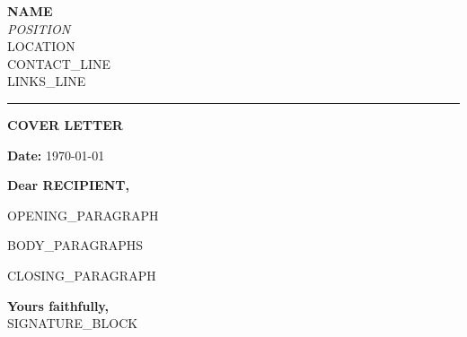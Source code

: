 \documentclass[11pt,a4]{article}
\begin{document}
\begin{center}
    \textbf{\Large {{NAME}}} \\[4pt]
    \textit{{{POSITION}}} \\
    {{LOCATION}} \\[4pt]
    {{CONTACT_LINE}} \\[2pt]
    {{LINKS_LINE}}
\end{center}

\vspace{0.2cm}
\hrule
\vspace{0.4cm}

\begin{center}
    {\LARGE \textbf{COVER LETTER}}
\end{center}

\vspace{0.2cm}
\textbf{Date:} \today

\vspace{0.3cm}
\textbf{Dear {{RECIPIENT}},}

\justify

{{OPENING_PARAGRAPH}}

{{BODY_PARAGRAPHS}}

{{CLOSING_PARAGRAPH}}

\vspace{0.5cm}
\textbf{Yours faithfully,} \\[6pt]
{{SIGNATURE_BLOCK}}
\end{document}
